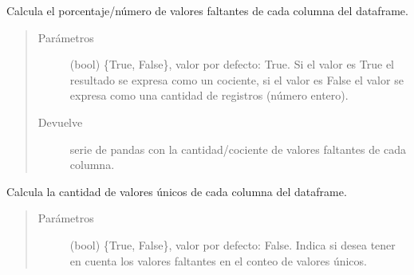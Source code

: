 \documentclass[letterpaper,10pt,openany,spanish]{sphinxmanual}
\begin{document}
\begin{fulllineitems}
\begin{fulllineitems}
\end{fulllineitems}


\begin{fulllineitems}
\label{\detokenize{calidad_datos:calidad_datos.CalidadDatos.ValoresFaltantes}}
Calcula el porcentaje/número de valores faltantes de cada columna             del dataframe.
\begin{quote}\begin{description}
\item[{Parámetros}] \leavevmode
{} \textendash{} (bool) \{True, False\}, valor por defecto: True. Si el             valor es True el resultado se expresa como un cociente, si el                 valor es False el valor se expresa como una cantidad de                     registros (número entero).

\item[{Devuelve}] \leavevmode
serie de pandas con la cantidad/cociente de valores             faltantes de cada columna.

\end{description}\end{quote}

\end{fulllineitems}


\begin{fulllineitems}
\label{\detokenize{calidad_datos:calidad_datos.CalidadDatos.ValoresUnicos}}
Calcula la cantidad de valores únicos de cada columna del dataframe.
\begin{quote}\begin{description}
\item[{Parámetros}] \leavevmode
{} \textendash{} (bool) \{True, False\}, valor por defecto: False.             Indica si desea tener en cuenta los valores faltantes en el                 conteo de valores únicos.


\end{description}
\end{quote}
\end{fulllineitems}
\end{fulllineitems}
\end{document}
